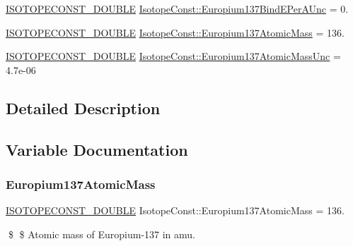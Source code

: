 \begin{DoxyCompactItemize}
\mbox{\hyperlink{group___isotope_const-_macros_ga8f45a7272ce02c0b4c65c44636ed719a}{I\+S\+O\+T\+O\+P\+E\+C\+O\+N\+S\+T\+\_\+\+D\+O\+U\+B\+LE}} \mbox{\hyperlink{group___isotope_const-_europium-_eu137_ga6b20c72fb10a1efeebb891ea603e3852}{Isotope\+Const\+::\+Europium137\+Bind\+E\+Per\+A\+Unc}} = 0.
\item 
\mbox{\hyperlink{group___isotope_const-_macros_ga8f45a7272ce02c0b4c65c44636ed719a}{I\+S\+O\+T\+O\+P\+E\+C\+O\+N\+S\+T\+\_\+\+D\+O\+U\+B\+LE}} \mbox{\hyperlink{group___isotope_const-_europium-_eu137_gae5dbe1474f1f961759908aae56e1970c}{Isotope\+Const\+::\+Europium137\+Atomic\+Mass}} = 136.
\item 
\mbox{\hyperlink{group___isotope_const-_macros_ga8f45a7272ce02c0b4c65c44636ed719a}{I\+S\+O\+T\+O\+P\+E\+C\+O\+N\+S\+T\+\_\+\+D\+O\+U\+B\+LE}} \mbox{\hyperlink{group___isotope_const-_europium-_eu137_gabca58b452c7f7936a91d967680866ca4}{Isotope\+Const\+::\+Europium137\+Atomic\+Mass\+Unc}} = 4.\+7e-\/06
\end{DoxyCompactItemize}


\subsection{Detailed Description}


\subsection{Variable Documentation}
\mbox{\label{group___isotope_const-_europium-_eu137_gae5dbe1474f1f961759908aae56e1970c}} 
\subsubsection{\texorpdfstring{Europium137\+Atomic\+Mass}{Europium137AtomicMass}}
{\footnotesize\ttfamily \mbox{\hyperlink{group___isotope_const-_macros_ga8f45a7272ce02c0b4c65c44636ed719a}{I\+S\+O\+T\+O\+P\+E\+C\+O\+N\+S\+T\+\_\+\+D\+O\+U\+B\+LE}} Isotope\+Const\+::\+Europium137\+Atomic\+Mass = 136.}

\$ \$ Atomic mass of Europium-\/137 in amu. \mbox{\label{group___isotope_const-_europium-_eu137_gabca58b452c7f7936a91d967680866ca4}} 
